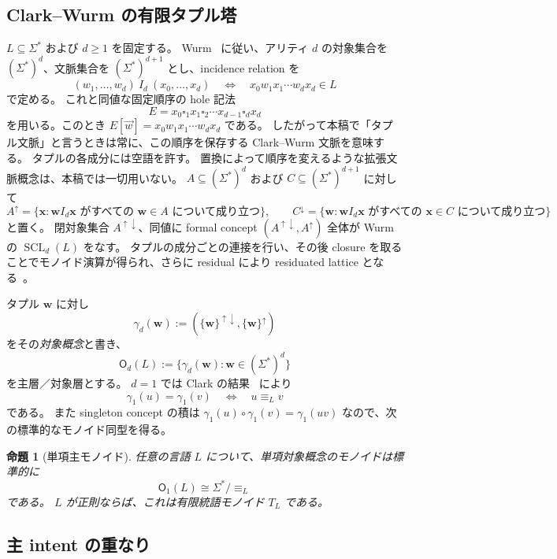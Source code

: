 \documentclass[10pt,a4paper]{ltjsarticle}
\newtheorem{proposition}[theorem]{命題}
\theoremstyle{definition}
\theoremstyle{remark}
\newcommand{\SCL}{\operatorname{SCL}}
\newcommand{\Obj}{\mathsf O}
\newcommand{\blank}{\square}
\begin{document}
\subsection{Clark--Wurm の有限タプル塔}

$L\subseteq\Sigma^*$ および $d\ge1$ を固定する。
Wurm~\cite{WurmSCLTuples} に従い、アリティ $d$ の対象集合を $(\Sigma^*)^d$、文脈集合を $(\Sigma^*)^{d+1}$ とし、incidence relation を
\[
(w_1,\ldots,w_d)\ I_d\ (x_0,\ldots,x_d)
\quad\Longleftrightarrow\quad
x_0w_1x_1\cdots w_dx_d\in L
\]
で定める。
これと同値な固定順序の hole 記法
\[
E=x_0\blank_1x_1\blank_2\cdots x_{d-1}\blank_dx_d
\]
を用いる。このとき
$E[\vec w]=x_0w_1x_1\cdots w_dx_d$ である。
したがって本稿で「タプル文脈」と言うときは常に、この順序を保存する Clark--Wurm 文脈を意味する。
タプルの各成分には空語を許す。
置換によって順序を変えるような拡張文脈概念は、本稿では一切用いない。
$A\subseteq(\Sigma^*)^d$ および $C\subseteq(\Sigma^*)^{d+1}$ に対して
\[
A^\uparrow=\{\mathbf x:\mathbf w I_d\mathbf x\text{ がすべての }\mathbf w\in A\text{ について成り立つ}\},
\qquad
C^\downarrow=\{\mathbf w:\mathbf w I_d\mathbf x\text{ がすべての }\mathbf x\in C\text{ について成り立つ}\}
\]
と置く。
閉対象集合 $A^{\uparrow\downarrow}$、同値に formal concept $(A^{\uparrow\downarrow},A^\uparrow)$ 全体が Wurm の $\SCL_d(L)$ をなす。
タプルの成分ごとの連接を行い、その後 closure を取ることでモノイド演算が得られ、さらに residual により residuated lattice となる~\cite{WurmSCLTuples}。

タプル $\mathbf w$ に対し
\[
\gamma_d(\mathbf w)
:=(\{\mathbf w\}^{\uparrow\downarrow},\{\mathbf w\}^\uparrow)
\]
をその\emph{対象概念}と書き、
\[
\Obj_d(L):=\{\gamma_d(\mathbf w):\mathbf w\in(\Sigma^*)^d\}
\]
を主層／対象層とする。
$d=1$ では Clark の結果~\cite[Proposition~3.19]{ClarkSCL} により
\[
\gamma_1(u)=\gamma_1(v)
\quad\Longleftrightarrow\quad
u\equiv_L v
\]
である。
また singleton concept の積は
$\gamma_1(u)\circ\gamma_1(v)=\gamma_1(uv)$
なので、次の標準的なモノイド同型を得る。

\begin{proposition}[単項主モノイド]
\label{scl:prop:unary-principal}
任意の言語 $L$ について、単項対象概念のモノイドは標準的に
\[
\Obj_1(L)\cong \Sigma^*/{\equiv_L}
\]
である。
$L$ が正則ならば、これは有限統語モノイド $T_L$ である。
\end{proposition}

\subsection{主 intent の重なり}
\end{document}
